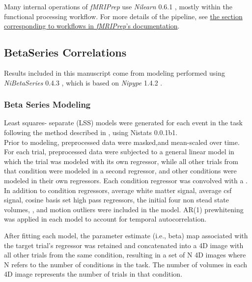 \documentclass[10pt,letterpaper]{article}
\begin{document}
Many internal operations of \emph{fMRIPrep} use \emph{Nilearn} 0.6.1
\cite[RRID:SCR\_001362]{nilearn}, mostly within the functional
processing workflow. For more details of the pipeline, see
\href{https://fmriprep.readthedocs.io/en/latest/workflows.html}{the
section corresponding to workflows in \emph{fMRIPrep}'s documentation}.

\subsection{BetaSeries Correlations}

Results included in this manuscript come from modeling performed using
\emph{NiBetaSeries} 0.4.3 \cite{Kent2018}, which is based on
\emph{Nipype} 1.4.2 \cite{Gorgolewski2011, Gorgolewski2018}.

\hypertarget{beta-series-modeling}{%
\subsubsection{Beta Series Modeling}\label{beta-series-modeling}}

Least squares- separate (LSS) models were generated for each event in
the task following the method described in \cite{Turner2012a}, using
Nistats 0.0.1b1.\\
Prior to modeling, preprocessed data were masked,and mean-scaled over
time. For each trial, preprocessed data were subjected to a general
linear model in which the trial was modeled with its own regressor, while
all other trials from that condition were modeled in a second regressor,
and other conditions were modeled in their own regressors. Each
condition regressor was convolved with a \cite[glover hemodynamic response
function]{Glover1999}.\\
In addition to condition regressors, average white matter signal, average csf signal,
cosine basis set high pass regressors, the initial four non stead state volumes,
\cite[friston 24]{Friston1996}, and motion outliers were included
in the model. AR(1) prewhitening was applied in each model to account
for temporal autocorrelation.

After fitting each model, the parameter estimate (i.e., beta) map
associated with the target trial's regressor was retained and
concatenated into a 4D image with all other trials from the same
condition, resulting in a set of N 4D images where N refers to the
number of conditions in the task. The number of volumes in each 4D image
represents the number of trials in that condition.
\end{document}
